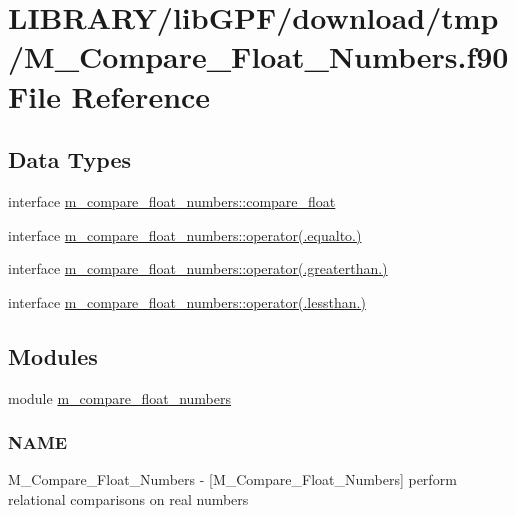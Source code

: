 \hypertarget{M__Compare__Float__Numbers_8f90}{}\section{L\+I\+B\+R\+A\+R\+Y/lib\+G\+P\+F/download/tmp/\+M\+\_\+\+Compare\+\_\+\+Float\+\_\+\+Numbers.f90 File Reference}
\label{M__Compare__Float__Numbers_8f90}
\subsection*{Data Types}
\begin{DoxyCompactItemize}
\item 
interface \hyperlink{interfacem__compare__float__numbers_1_1compare__float}{m\+\_\+compare\+\_\+float\+\_\+numbers\+::compare\+\_\+float}
\item 
interface \hyperlink{interfacem__compare__float__numbers_1_1operator_07_8equalto_8_08}{m\+\_\+compare\+\_\+float\+\_\+numbers\+::operator(.\+equalto.)}
\item 
interface \hyperlink{interfacem__compare__float__numbers_1_1operator_07_8greaterthan_8_08}{m\+\_\+compare\+\_\+float\+\_\+numbers\+::operator(.\+greaterthan.)}
\item 
interface \hyperlink{interfacem__compare__float__numbers_1_1operator_07_8lessthan_8_08}{m\+\_\+compare\+\_\+float\+\_\+numbers\+::operator(.\+lessthan.)}
\end{DoxyCompactItemize}
\subsection*{Modules}
\begin{DoxyCompactItemize}
\item 
module \hyperlink{namespacem__compare__float__numbers}{m\+\_\+compare\+\_\+float\+\_\+numbers}
\begin{DoxyCompactList}\small\item\em \subsubsection*{N\+A\+ME}

M\+\_\+\+Compare\+\_\+\+Float\+\_\+\+Numbers -\/ \mbox{[}M\+\_\+\+Compare\+\_\+\+Float\+\_\+\+Numbers\mbox{]} perform relational comparisons on real numbers \end{DoxyCompactList}\end{DoxyCompactItemize}
